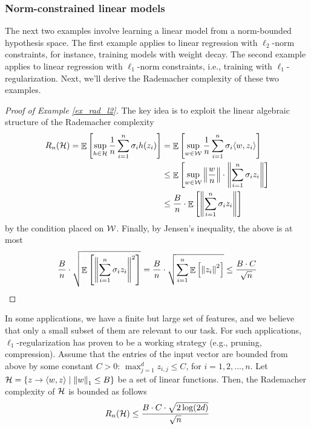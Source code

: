 \subsubsection{Norm-constrained linear models}

The next two examples involve learning a linear model from a norm-bounded hypothesis space.
The first example applies to linear regression with $\ell_2$-norm constraints, for instance, training models with weight decay.
The second example applies to linear regression with $\ell_1$-norm constraints, i.e., training with $\ell_1$-regularization.
Next, we'll derive the Rademacher complexity of these two examples.

\begin{proof}[Proof of Example \ref{ex_rad_l2}]
    The key idea is to exploit the linear algebraic structure of the Rademacher complexity
    \begin{align*}
        R_n(\mathcal{H}) = \mathop{\mathbb{E}}\left[ \sup_{h\in\mathcal{H}} \frac 1 n \sum_{i=1}^n \sigma_i h(z_i) \right]
        &= \mathop{\mathbb{E}}\left[ \sup_{w\in\mathcal{W}} \frac 1 n\sum_{i=1}^n \sigma_i \langle w, z_i \rangle \right] \\
        &\le \mathop{\mathbb{E}}\left[ \sup_{w \in \mathcal{W}} \left\| \frac {w} n \right\| \cdot \left\| \sum_{i=1}^n \sigma_i z_i \right\| \right] \\
        &\le \frac{ B } n \cdot \mathop{\mathbb{E}}\left[ \left\|  \sum_{i=1}^n \sigma_i z_i \right\| \right]
    \end{align*}
    by the condition placed on $\mathcal{W}$.
    Finally, by Jensen's inequality, the above is at most
    \begin{align*}
        \frac B n \cdot \sqrt{\mathop{\mathbb{E}}\left[ \left\| \sum_{i=1}^n \sigma_i z_i \right\|^2  \right]}
        = \frac B n \cdot \sqrt{\sum_{i=1}^n \mathop{\mathbb{E}}\left[ \left\| z_i \right\|^2 \right]}
        \le \frac {B \cdot C} {\sqrt n}
    \end{align*}
\end{proof}

\begin{example}
In some applications, we have a finite but large set of features, and we believe that only a small subset of them are relevant to our task.
For such applications, $\ell_1$-regularization has proven to be a working strategy (e.g., pruning, compression).
Assume that the entries of the input vector are bounded from above by some constant $C > 0$: $\max_{j=1}^d z_{i, j} \le C$, for $i = 1, 2, \dots, n$.
Let $\mathcal{H} = \left\{z \rightarrow \langle w, z \rangle \mid \left\| w \right\|_1 \le B\right\}$ be a set of linear functions.
Then, the Rademacher complexity of $\mathcal{H}$ is bounded as follows
\begin{align*}
    R_n(\mathcal{H}) \le \frac{ B \cdot C \cdot \sqrt{2\log(2d)}} {\sqrt n}
\end{align*}
\end{example}

